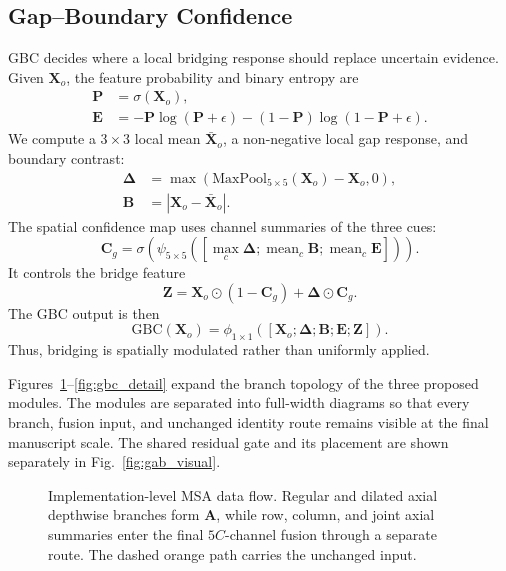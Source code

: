 \documentclass[preprint,12pt]{elsarticle}
\begin{document}
\subsection{Gap--Boundary Confidence}
\label{sec:gbc}

GBC decides where a local bridging response should replace uncertain evidence. Given $\mathbf{X}_o$, the feature probability and binary entropy are
\begin{align}
\mathbf{P} &= \sigma(\mathbf{X}_{o}), \\
\mathbf{E} &= -\mathbf{P}\log(\mathbf{P}+\epsilon)
-(1-\mathbf{P})\log(1-\mathbf{P}+\epsilon).
\end{align}
We compute a $3\times3$ local mean $\bar{\mathbf{X}}_o$, a non-negative local gap response, and boundary contrast:
\begin{align}
\boldsymbol{\Delta} &= \max\!\left(
\mathrm{MaxPool}_{5\times5}(\mathbf{X}_o)-\mathbf{X}_o,0\right), \\
\mathbf{B} &= |\mathbf{X}_o-\bar{\mathbf{X}}_o|.
\end{align}
The spatial confidence map uses channel summaries of the three cues:
\begin{equation}
\mathbf{C}_{g}=\sigma\!\left(
\psi_{5\times5}
([\max_c\boldsymbol{\Delta};\operatorname{mean}_c\mathbf{B};
\operatorname{mean}_c\mathbf{E}])\right).
\label{eq:confidence}
\end{equation}
It controls the bridge feature
\begin{equation}
\mathbf{Z}=\mathbf{X}_o\odot(1-\mathbf{C}_{g})+
\boldsymbol{\Delta}\odot\mathbf{C}_{g}.
\end{equation}
The GBC output is then
\begin{equation}
\mathrm{GBC}(\mathbf{X}_o)=\phi_{1\times1}
([\mathbf{X}_o;\boldsymbol{\Delta};\mathbf{B};\mathbf{E};\mathbf{Z}]).
\label{eq:gbc}
\end{equation}
Thus, bridging is spatially modulated rather than uniformly applied.

Figures~\ref{fig:msa_detail}--\ref{fig:gbc_detail} expand the branch topology of the three proposed modules. The modules are separated into full-width diagrams so that every branch, fusion input, and unchanged identity route remains visible at the final manuscript scale. The shared residual gate and its placement are shown separately in Fig.~\ref{fig:gab_visual}.

\begin{figure}[H]
\centering

\caption{Implementation-level MSA data flow. Regular and dilated axial depthwise branches form $\mathbf{A}$, while row, column, and joint axial summaries enter the final $5C$-channel fusion through a separate route. The dashed orange path carries the unchanged input.}
\label{fig:msa_detail}
\end{figure}
\end{document}
